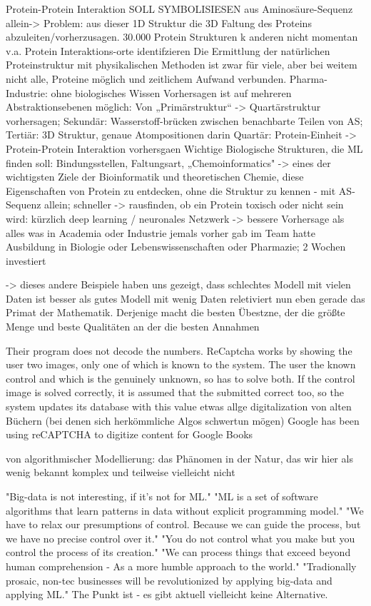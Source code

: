 \documentclass[authoryear,review,3p]{elsarticle}
\begin{document}
Protein-Protein Interaktion
SOLL SYMBOLISIESEN
aus Aminosäure-Sequenz allein-> Problem: aus dieser 1D Struktur die 3D Faltung des Proteins abzuleiten/vorherzusagen. 30.000 Protein Strukturen k anderen nicht
momentan v.a. Protein Interaktions-orte identifzieren
Die Ermittlung der natürlichen Proteinstruktur mit physikalischen Methoden ist zwar für viele, aber bei weitem nicht alle, Proteine möglich und zeitlichem Aufwand verbunden.
Pharma-Industrie:
ohne biologisches Wissen
Vorhersagen ist auf mehreren Abstraktionsebenen möglich:
Von „Primärstruktur“ -> Quartärstruktur vorhersagen; Sekundär: Wasserstoff-brücken zwischen benachbarte Teilen von AS; Tertiär: 3D Struktur, genaue Atompositionen darin
Quartär: Protein-Einheit -> Protein-Protein Interaktion vorhersgaen
Wichtige Biologische Strukturen, die ML finden soll: Bindungsstellen, Faltungsart,
„Chemoinformatics"
-> eines der wichtigsten Ziele der Bioinformatik und theoretischen Chemie, diese Eigenschaften von Protein zu entdecken, ohne die Struktur zu kennen - mit AS-Sequenz allein; schneller -> rausfinden, ob ein Protein toxisch oder nicht sein wird: kürzlich deep learning / neuronales Netzwerk -> bessere Vorhersage als alles was in Academia oder Industrie jemals vorher gab im Team hatte Ausbildung in Biologie oder Lebenswissenschaften oder Pharmazie; 2 Wochen investiert


-> dieses andere Beispiele haben uns gezeigt, dass
schlechtes Modell mit vielen Daten ist besser als gutes Modell mit wenig Daten
reletiviert nun eben gerade das Primat der Mathematik. Derjenige macht die besten Übestzne, der die größte Menge und beste Qualitäten an der die besten Annahmen



Their program does not decode the numbers. ReCaptcha works by showing the user two images, only one of which is known to the system. The user the known control and which is the genuinely unknown, so has to solve both. If the control image is solved correctly, it is assumed that the submitted correct too, so the system updates its database with this value
etwas allge
digitalization von alten Büchern (bei denen sich herkömmliche Algos schwertun mögen)
Google has been using reCAPTCHA to digitize content for Google Books


von algorithmischer Modellierung: das Phänomen in der Natur, das wir hier als wenig bekannt komplex und teilweise vielleicht nicht



"Big-data is not interesting, if it's not for ML."
"ML is a set of software algorithms that learn patterns in data without explicit programming model."
"We have to relax our presumptions of control. Because we can guide the process, but we have no precise control over it." "You do not control what you make but you control the process of its creation."
"We can process things that exceed beyond human comprehension - As a more humble approach to the world." "Tradionally prosaic, non-tec businesses will be revolutionized by applying big-data and applying ML."
The Punkt ist - es gibt aktuell vielleicht keine Alternative.
\end{document}
